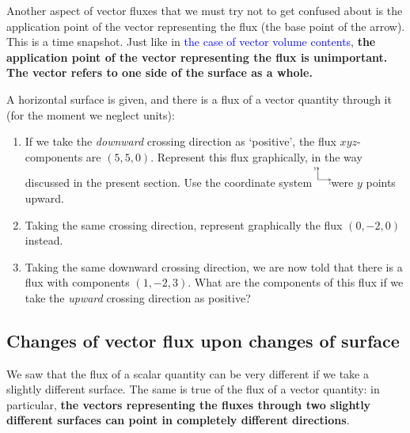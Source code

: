 \documentclass[a4paper,12pt,%
onecolumn,oneside,titlepage,%
british%
]{memoir}
\renewcommand*{\|}[1][]{\nonscript\:#1\vert\nonscript\:\mathopen{}}
\newcommand*{\sect}{\S}%
\renewcommand*{\autoref}[2]{\sidepar{\vspace{-1ex}\footnotesize{\color{blue}\faIcon{%
angle-right%
}\enspace\sect\,\ref{#1} page\,\pageref{#1}}}\textcolor{blue}{#2}}
\begin{document}
\medskip

Another aspect of vector fluxes that we must try not to get confused about is the application point of the vector representing the flux (the base point of the arrow). This is a time snapshot. Just like in \autoref{item:applicationpoint}{the case of vector volume contents}, \textbf{the application point of the vector representing the flux is unimportant. The vector refers to one side of the surface as a whole.}

\medskip

\begin{exercise}
  A horizontal surface is given, and there is a flux of a vector quantity through it (for the moment we neglect units):
  \begin{enumerate}[label=\arabic*.]
  \item If we take the \emph{downward} crossing direction as \enquote*{positive}, the flux $xyz$-components are $(5,5,0)$. Represent this flux graphically, in the way discussed in the present section. Use the coordinate system\enspace\includegraphics[align=c,height=2em]{images/coords_xy.pdf}\enspace were $y$ points upward.
  \item Taking the same crossing direction, represent graphically the flux $(0,-2,0)$ instead.
  \item Taking the same downward crossing direction, we are now told that there is a flux with components $(1,-2,3)$. What are the components of this flux if we take the \emph{upward} crossing direction as positive?
  \end{enumerate}
\end{exercise}


\medskip

\subsection{Changes of vector flux upon changes of surface}
\label{sec:surface_change_scalar}

We saw that the flux of a scalar quantity can be very different if we take a slightly different surface. The same is true of the flux of a vector quantity: in particular, \textbf{the vectors representing the fluxes through two slightly different surfaces can point in completely different directions}.
\end{document}
